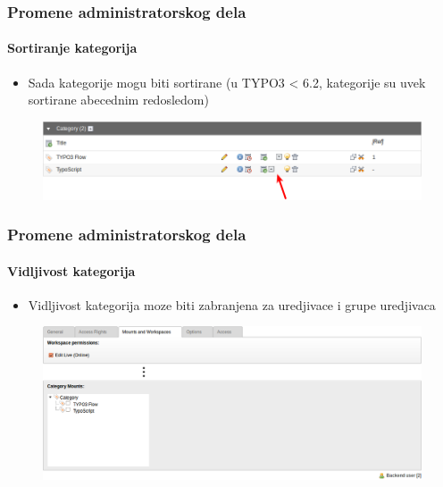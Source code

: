 
\begin{frame}[fragile]
	\frametitle{Promene administratorskog dela}
	\framesubtitle{Sortiranje kategorija}

 	\begin{itemize}
		\item Sada kategorije mogu biti sortirane\newline
			\small(u TYPO3 < 6.2, kategorije su uvek sortirane abecednim redosledom)\normalsize
	\end{itemize}

	\begin{figure}
		\includegraphics[width=0.95\linewidth]{Images/BackendChanges/CategorySorting.png}
	\end{figure}

\end{frame}


\begin{frame}[fragile]
	\frametitle{Promene administratorskog dela}
	\framesubtitle{Vidljivost kategorija}

 	\begin{itemize}
		\item Vidljivost kategorija moze biti zabranjena za uredjivace i grupe uredjivaca
	\end{itemize}

	\begin{figure}
		\includegraphics[width=0.95\linewidth]{Images/BackendChanges/CategoryVisibility.png}
	\end{figure}

\end{frame}

